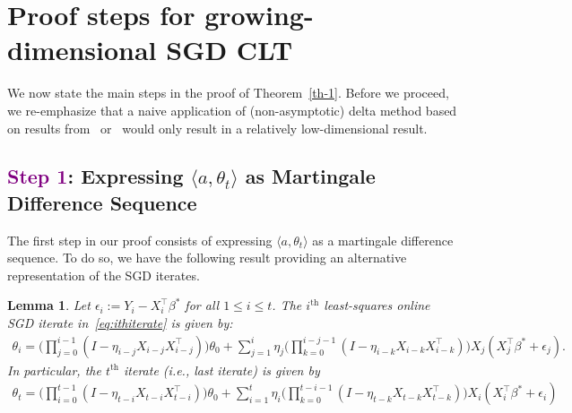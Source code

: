 \documentclass[11pt, reqno,english]{amsart}
\newtheorem{lemma}{Lemma}[section]
\begin{document}







\appendix

\section{Proof steps for growing-dimensional SGD CLT}\label{sec:proofsketch}
We now state the main steps in the proof of Theorem~\ref{th-1}. Before we proceed, we re-emphasize that a naive application of (non-asymptotic) delta method based on results from~\cite{anastasiou2019normal} or~\cite{shao2022berry} would only result in a relatively low-dimensional result. 

\subsection*{\textcolor{purple}{Step 1}: Expressing $\langle a, \theta_t\rangle$
as Martingale Difference Sequence}

The first step in our proof consists of expressing $\langle a, \theta_t\rangle$ as a martingale difference sequence. To do so, we have the following result providing an alternative representation of the SGD iterates. 

\begin{lemma}\label{prop:iterate}
Let $\epsilon_i := Y_i - X^\top_i \beta^*$ for all $1 \leq i \leq t$. The $i^{\textrm{th}}$ least-squares online SGD iterate in~\eqref{eq:ithiterate} is given by:
\begin{align*}
       \theta_i = \bigg(\prod_{j = 0}^{i-1}(I - \eta_{i-j}X_{i-j}X^\top_{i-j})\bigg)\theta_0 + \sum_{j = 1}^{i}\eta_j\bigg(\prod_{k = 0}^{i-j-1}(I - \eta_{i-k}X_{i-k}X_{i-k}^\top)\bigg)X_j(X_j^\top \beta^* + \epsilon_j).
\end{align*}
In particular, the $t^{\textrm{th}}$ iterate (i.e., last iterate) is given by
\begin{align*}
    \theta_t = \bigg(\prod_{i = 0}^{t-1}(I - \eta_{t-i}X_{t-i}X^\top_{t-i})\bigg)\theta_0 + \sum_{i = 1}^{t}\eta_i\bigg(\prod_{k = 0}^{t-i-1}(I - \eta_{t-k}X_{t-k}X_{t-k}^\top)\bigg)X_i(X_i^\top \beta^* + \epsilon_i)
\end{align*}
\end{lemma}
\end{document}
